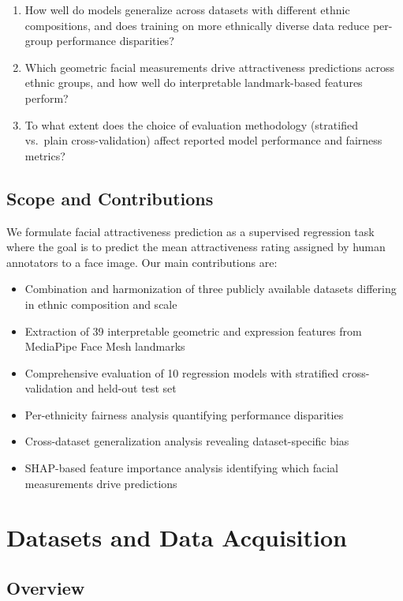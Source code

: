 \documentclass[a4paper,oneside,bibliography=totoc]{scrbook}
\begin{document}
\begin{enumerate}
\item How well do models generalize across datasets with different ethnic compositions, and does training on more ethnically diverse data reduce per-group performance disparities?
\item Which geometric facial measurements drive attractiveness predictions across ethnic groups, and how well do interpretable landmark-based features perform?
\item To what extent does the choice of evaluation methodology (stratified vs.\ plain cross-validation) affect reported model performance and fairness metrics?
\end{enumerate}


\section{Scope and Contributions}

We formulate facial attractiveness prediction as a supervised regression task where the goal is to predict the mean attractiveness rating assigned by human annotators to a face image. Our main contributions are:

\begin{itemize}
\item Combination and harmonization of three publicly available datasets differing in ethnic composition and scale
\item Extraction of 39 interpretable geometric and expression features from MediaPipe Face Mesh landmarks
\item Comprehensive evaluation of 10 regression models with stratified cross-validation and held-out test set
\item Per-ethnicity fairness analysis quantifying performance disparities
\item Cross-dataset generalization analysis revealing dataset-specific bias
\item SHAP-based feature importance analysis identifying which facial measurements drive predictions
\end{itemize}


\chapter{Datasets and Data Acquisition}
\label{ch:datasets}

\section{Overview}
\end{document}
